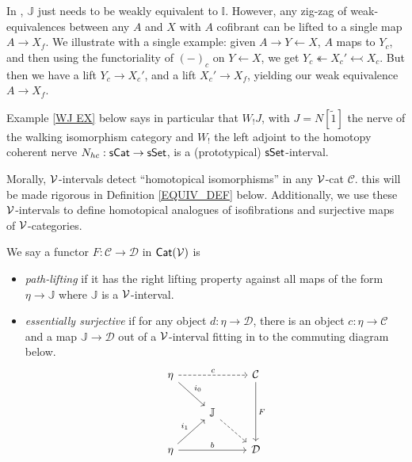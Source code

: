 \documentclass[a4paper,10pt
,draft
]{article}%
\newcommand{\I}{\mathbb I}
\newcommand{\J}{\mathbb J}
\renewcommand{\1}{\eta}%
\begin{document}
\begin{remark}
      In \cite{BM13}, $\J$ just needs to be weakly equivalent to $\I$.
      However, any zig-zag of weak-equivalences between any $A$ and $X$ with $A$ cofibrant
      can be lifted to a single map $A \to X_f$.
      We illustrate with a single example:
      given $A \to Y \leftarrow X$, $A$ maps to $Y_c$, and then using the functoriality of $(-)_c$ on $Y \leftarrow X$, we get
      $Y_c \twoheadleftarrow X_c' \leftarrowtail X_c$.
      But then we have a lift $Y_c \to X_c'$, and a lift $X_c' \to X_f$, yielding our weak equivalence $A \to X_f$.      
\end{remark}

Example \ref{WJ EX} below says in particular that $W_!J$,
with $J = N[\tilde 1]$ the nerve of the walking isomorphism category and
$W_!$ the left adjoint to the homotopy coherent nerve $N_{hc}: \mathsf{sCat} \to \mathsf{sSet}$,
is a (prototypical) $\mathsf{sSet}$-interval.

Morally, $\mathcal V$-intervals detect ``homotopical isomorphisms'' in any $\mathcal V$-cat $\mathcal C$.
this will be made rigorous in Definition \ref{EQUIV_DEF} below.
Additionally, we use these $\mathcal V$-intervals to define homotopical analogues of isofibrations and surjective maps of $\mathcal V$-categories.

\begin{definition}
      \label{PL_ES_DEFN}
      We say a functor $F: \mathcal C \to \mathcal D$ in $\mathsf{Cat}(\mathcal V)$ is
      \begin{itemize} %
      \item \textit{path-lifting}
            if it has the right lifting property against all maps of the form
            $\1 \to \J$
            where $\J$ is a $\mathcal V$-interval.
      \item \textit{essentially surjective}
            if for any object $d: \1 \to \mathcal D$,
            there is an object $c: \1 \to \mathcal C$
            and a map $\J \to \mathcal D$ out of a $\mathcal V$-interval fitting in to the commuting diagram below.
            \begin{equation}
                  \label{ESSURJ_EQ}
                  \begin{tikzcd}
                        \1 \arrow[rr, dashed, "c"] \arrow[dr, "i_0"]
                        &&
                        \mathcal C \arrow[dd, "F"]
                        \\
                        &
                        \J \arrow[dr, dashed]
                        \\
                        \1 \arrow[ur, " i_1"] \arrow[rr,"b"]
                        &&
                        \mathcal D
                  \end{tikzcd}
            \end{equation}
      \end{itemize}
\end{definition}
\end{document}
